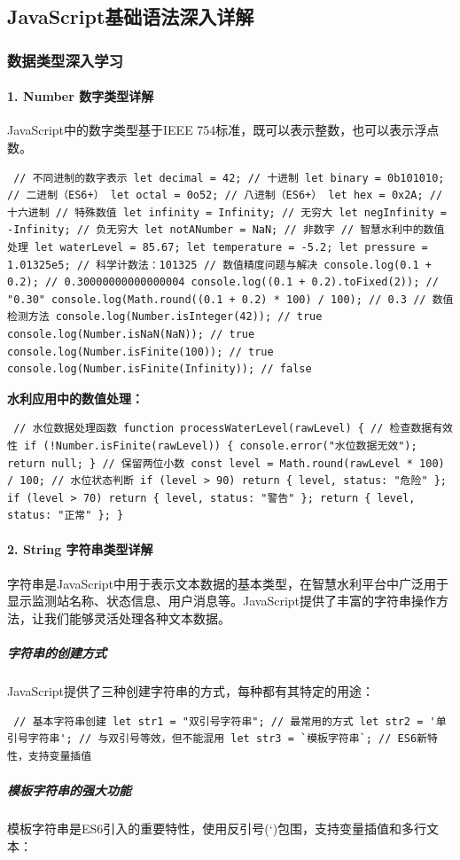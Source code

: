 \subsection{JavaScript基础语法深入详解}\label{javascriptux57faux7840ux8bedux6cd5ux6df1ux5165ux8be6ux89e3} \subsubsection{数据类型深入学习}\label{ux6570ux636eux7c7bux578bux6df1ux5165ux5b66ux4e60} \paragraph{1. Number 数字类型详解}\label{number-ux6570ux5b57ux7c7bux578bux8be6ux89e3} JavaScript中的数字类型基于IEEE 754标准，既可以表示整数，也可以表示浮点数。 \begin{verbatim} // 不同进制的数字表示 let decimal = 42; // 十进制 let binary = 0b101010; // 二进制（ES6+） let octal = 0o52; // 八进制（ES6+） let hex = 0x2A; // 十六进制 // 特殊数值 let infinity = Infinity; // 无穷大 let negInfinity = -Infinity; // 负无穷大 let notANumber = NaN; // 非数字 // 智慧水利中的数值处理 let waterLevel = 85.67; let temperature = -5.2; let pressure = 1.01325e5; // 科学计数法：101325 // 数值精度问题与解决 console.log(0.1 + 0.2); // 0.30000000000000004 console.log((0.1 + 0.2).toFixed(2)); // "0.30" console.log(Math.round((0.1 + 0.2) * 100) / 100); // 0.3 // 数值检测方法 console.log(Number.isInteger(42)); // true console.log(Number.isNaN(NaN)); // true console.log(Number.isFinite(100)); // true console.log(Number.isFinite(Infinity)); // false \end{verbatim} \textbf{水利应用中的数值处理：} \begin{verbatim} // 水位数据处理函数 function processWaterLevel(rawLevel) { // 检查数据有效性 if (!Number.isFinite(rawLevel)) { console.error("水位数据无效"); return null; } // 保留两位小数 const level = Math.round(rawLevel * 100) / 100; // 水位状态判断 if (level > 90) return { level, status: "危险" }; if (level > 70) return { level, status: "警告" }; return { level, status: "正常" }; } \end{verbatim} \paragraph{2. String 字符串类型详解}\label{string-ux5b57ux7b26ux4e32ux7c7bux578bux8be6ux89e3} 字符串是JavaScript中用于表示文本数据的基本类型，在智慧水利平台中广泛用于显示监测站名称、状态信息、用户消息等。JavaScript提供了丰富的字符串操作方法，让我们能够灵活处理各种文本数据。 \subparagraph{字符串的创建方式}\label{ux5b57ux7b26ux4e32ux7684ux521bux5efaux65b9ux5f0f} JavaScript提供了三种创建字符串的方式，每种都有其特定的用途： \begin{verbatim} // 基本字符串创建 let str1 = "双引号字符串"; // 最常用的方式 let str2 = '单引号字符串'; // 与双引号等效，但不能混用 let str3 = `模板字符串`; // ES6新特性，支持变量插值 \end{verbatim} \subparagraph{模板字符串的强大功能}\label{ux6a21ux677fux5b57ux7b26ux4e32ux7684ux5f3aux5927ux529fux80fd} 模板字符串是ES6引入的重要特性，使用反引号(`)包围，支持变量插值和多行文本： 